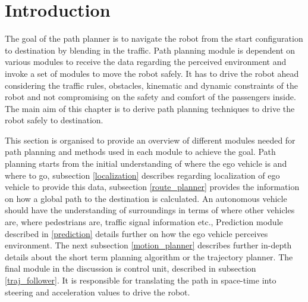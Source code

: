 \section{Introduction}


The goal of the path planner is to navigate the robot from the start configuration to destination by blending in the traffic. Path planning module is dependent on various modules to receive the data regarding the perceived environment and invoke a set of modules to move the robot safely. It has to drive the robot ahead considering the traffic rules, obstacles, kinematic and dynamic constraints of the robot and not compromising on the safety and comfort of the passengers inside. The main aim of this chapter is to derive path planning techniques to drive the robot safely to destination.

This section is organised to provide an overview of different modules needed for path planning and methods used in each module to achieve the goal. Path planning starts from the initial understanding of where the ego vehicle is and where to go, subsection \ref{localization} describes regarding localization of ego vehicle to provide this data, subsection \ref{route_planner} provides the information on how a global path to the destination is calculated. An autonomous vehicle should have the understanding of surroundings in terms of where other vehicles are, where pedestrians are, traffic signal information etc., Prediction module described in \ref{prediction} details further on how the ego vehicle perceives environment. The next subsection \ref{motion_planner} describes further in-depth details about the short term planning algorithm or the trajectory planner. The final module in the discussion is control unit, described in subsection \ref{traj_follower}. It is responsible for translating the path in space-time into steering and acceleration values to drive the robot.

